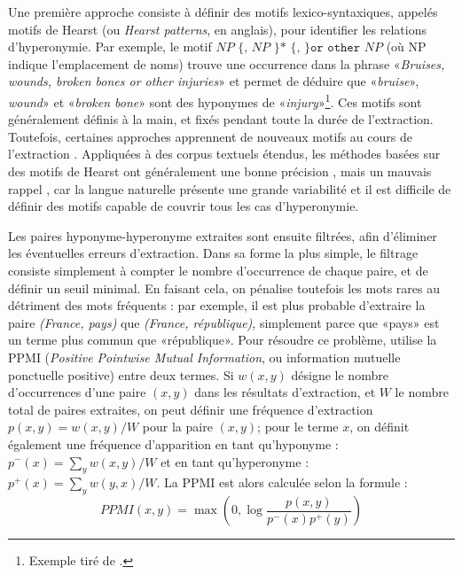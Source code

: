 Une première approche consiste à définir des motifs lexico-syntaxiques, appelés motifs de Hearst \cite{hearst1992automatic} (ou \textit{Hearst patterns}, en anglais), pour identifier les relations d'hyperonymie. Par exemple, le motif $NP \texttt{ \{, } NP \texttt{ \}* \{, \} or other } NP$ (où NP indique l'emplacement de noms) trouve une occurrence dans la phrase «\textit{Bruises, wounds, broken bones or other injuries}» et permet de déduire que «\textit{bruise}», \textit{wound}» et «\textit{broken bone}» sont des hyponymes de «\textit{injury}»\footnote{Exemple tiré de \cite{hearst1992automatic}.}.
Ces motifs sont généralement définis à la main, et fixés pendant toute la durée de l'extraction. Toutefois, certaines approches apprennent de nouveaux motifs au cours de l'extraction \cite{snow2005learning, shwartz-etal-2016-improving}. Appliquées à des corpus textuels étendus, les méthodes basées sur des motifs de Hearst ont généralement une bonne précision \cite{roller-etal-2018-hearst}, mais un mauvais rappel \cite{wu2008automatically}, car la langue naturelle présente une grande variabilité et il est difficile de définir des motifs capable de couvrir tous les cas d'hyperonymie.

Les paires hyponyme-hyperonyme extraites sont ensuite filtrées, afin d'éliminer les éventuelles erreurs d'extraction. Dans sa forme la plus simple, le filtrage consiste simplement à compter le nombre d'occurrence de chaque paire, et de définir un seuil minimal. En faisant cela, on pénalise toutefois les mots rares au détriment des mots fréquents : par exemple, il est plus probable d'extraire la paire \textit{(France, pays)} que \textit{(France, république)}, simplement parce que «pays» est un terme plus commun que «république». Pour résoudre ce problème, \cite{turney2001mining} utilise la PPMI (\textit{Positive Pointwise Mutual Information}, ou information mutuelle ponctuelle positive) entre deux termes. Si $w(x, y)$ désigne le nombre d'occurrences d'une paire $(x, y)$ dans les résultats d'extraction, et $W$ le nombre total de paires extraites, on peut définir une fréquence d'extraction $p(x, y) = w(x,y) / W$ pour la paire $(x, y)$; pour le terme $x$, on définit également une fréquence d'apparition en tant qu'hyponyme : $p^-(x) = \sum_y w(x, y) / W$ et en tant qu'hyperonyme : $p^+(x) = \sum_y w(y, x) / W$. La PPMI est alors calculée selon la formule :
\begin{equation}
    PPMI(x, y) = \max \left(0, \log\frac{p(x, y)}{p^-(x)p^+(y)} \right)
\end{equation}

